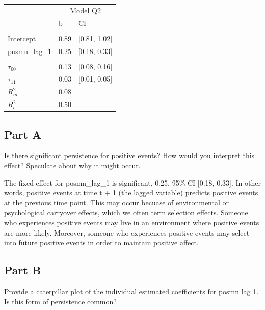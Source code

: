 \documentclass[]{article}
\begin{document}
\begin{table}[H]
\centering
\begin{tabular}{lll}
\toprule
\multicolumn{1}{c}{ } & \multicolumn{2}{c}{Model Q2} \\
\cmidrule(l{2pt}r{2pt}){2-3}
 & b & CI\\
\midrule
\addlinespace[0.3em]
\multicolumn{3}{l}{\textbf{Fixed}}\\
\hspace{1em}Intercept & 0.89 & [0.81, 1.02]\\
\hspace{1em}posmn\_lag\_1 & 0.25 & [0.18, 0.33]\\
\addlinespace[0.3em]
\multicolumn{3}{l}{\textbf{Random}}\\
\hspace{1em}$\tau_{00}$ & 0.13 & [0.08, 0.16]\\
\hspace{1em}$\tau_{11}$ & 0.03 & [0.01, 0.05]\\
$R^2_m$ & 0.08 & \\
$R^2_c$ & 0.50 & \\
\bottomrule
\end{tabular}
\end{table}

\subsection{Part A}\label{part-a-1}

Is there significant persistence for positive events? How would you
interpret this effect? Speculate about why it might occur.

The fixed effect for posmn\_lag\_1 is significant, 0.25, 95\% CI
{[}0.18, 0.33{]}. In other words, positive events at time t + 1 (the
lagged variable) predicts positive events at the previous time point.
This may occur becuase of environmental or psychological carryover
effects, which we often term selection effects. Someone who experiences
positive events may live in an environment where positive events are
more likely. Moreover, someone who experiences positive events may
select into future positive events in order to maintain positive affect.

\subsection{Part B}\label{part-b-1}

Provide a caterpillar plot of the individual estimated coefficients for
posmn lag 1. Is this form of persistence common?
\end{document}
